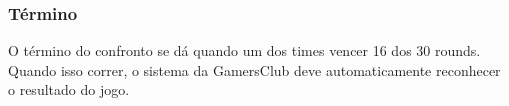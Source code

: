 \subsubsection{Término}

O término do confronto se dá quando um dos times vencer 16 dos 30 rounds. Quando isso correr, o sistema da GamersClub deve automaticamente reconhecer o resultado do jogo.
